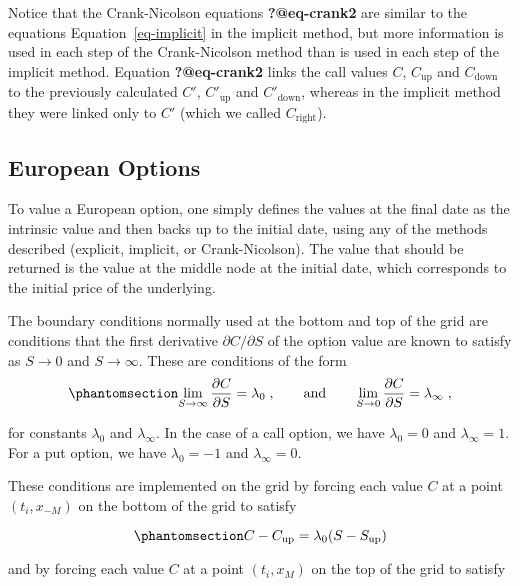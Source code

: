 \documentclass[
  letterpaper,
  DIV=11,
  numbers=noendperiod]{scrartcl}
\theoremstyle{definition}
\theoremstyle{remark}
\begin{document}
Notice that the Crank-Nicolson equations \textbf{?@eq-crank2} are
similar to the equations Equation~\ref{eq-implicit} in the implicit
method, but more information is used in each step of the Crank-Nicolson
method than is used in each step of the implicit method. Equation
\textbf{?@eq-crank2} links the call values \(C\), \(C_{\text{up}}\) and
\(C_{\text{down}}\) to the previously calculated \(C'\),
\(C'_{\text{up}}\) and \(C'_{\text{down}}\), whereas in the implicit
method they were linked only to \(C'\) (which we called
\(C_{\text{right}}\)).

\subsection{European Options}\label{european-options}

To value a European option, one simply defines the values at the final
date as the intrinsic value and then backs up to the initial date, using
any of the methods described (explicit, implicit, or Crank-Nicolson).
The value that should be returned is the value at the middle node at the
initial date, which corresponds to the initial price of the underlying.

The boundary conditions normally used at the bottom and top of the grid
are conditions that the first derivative \(\partial C/\partial S\) of
the option value are known to satisfy as \(S \rightarrow 0\) and
\(S \rightarrow \infty\). These are conditions of the form
\begin{equation}\phantomsection\label{eq-cn_boundary}{
\lim_{S \rightarrow \infty} \frac{\partial C}{\partial S} =  \lambda_0\;,\qquad \text{and} \qquad
\lim_{S \rightarrow 0} \frac{\partial C}{\partial S} = \lambda_{\infty}\;,
}\end{equation}

for constants \(\lambda_0\) and \(\lambda_{\infty}\). In the case of a
call option, we have \(\lambda_0=0\) and \(\lambda_{\infty}=1\). For a
put option, we have \(\lambda_0=-1\) and \(\lambda_\infty = 0.\)

These conditions are implemented on the grid by forcing each value \(C\)
at a point \((t_i,x_{-M})\) on the bottom of the grid to satisfy

\begin{equation}\phantomsection\label{eq-crank4a}{
C - C_{\text{up}} = \lambda_0 (S - S_{\text{up}})
}\end{equation}

and by forcing each value \(C\) at a point \((t_i,x_{M})\) on the top of
the grid to satisfy
\end{document}
